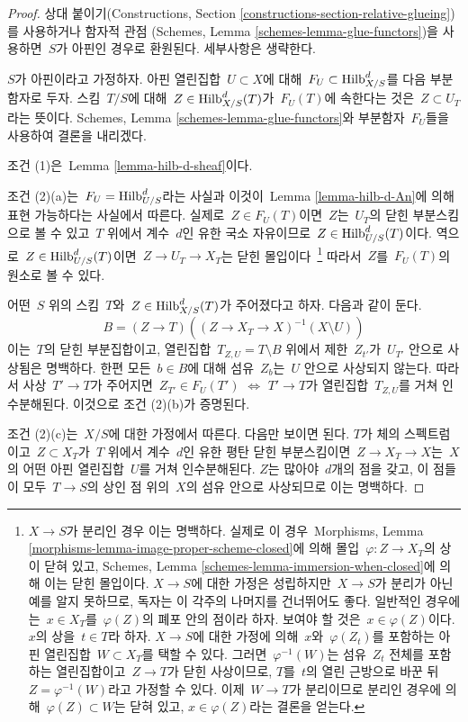 \begin{proof}
상대 붙이기(Constructions, Section
\ref{constructions-section-relative-glueing})를 사용하거나 함자적 관점
(Schemes, Lemma \ref{schemes-lemma-glue-functors})을 사용하면\ 
$S$가 아핀인 경우로 환원된다. 세부사항은 생략한다.

\medskip\noindent
$S$가 아핀이라고 가정하자. 아핀 열린집합\  $U \subset X$에 대해\ 
$F_U \subset \mathrm{Hilb}^d_{X/S}$를 다음 부분함자로 두자.
스킴\  $T/S$에 대해\  $Z \in \mathrm{Hilb}^d_{X/S}(T)$가\ 
$F_U(T)$에 속한다는 것은\  $Z \subset U_T$라는 뜻이다. Schemes, Lemma
\ref{schemes-lemma-glue-functors}와 부분함자\  $F_U$들을 사용하여 결론을
내리겠다.

\medskip\noindent
조건 (1)은\  Lemma \ref{lemma-hilb-d-sheaf}이다.

\medskip\noindent
조건 (2)(a)는\  $F_U = \mathrm{Hilb}^d_{U/S}$라는 사실과 이것이\  Lemma
\ref{lemma-hilb-d-An}에 의해 표현 가능하다는 사실에서 따른다.
실제로\  $Z \in F_U(T)$이면\  $Z$는\  $U_T$의 닫힌 부분스킴으로 볼 수 있고\ 
$T$ 위에서 계수\  $d$인 유한 국소 자유이므로\ 
$Z \in \mathrm{Hilb}^d_{U/S}(T)$이다. 역으로\ 
$Z \in \mathrm{Hilb}^d_{U/S}(T)$이면\  $Z \to U_T \to X_T$는 닫힌 몰입이다\ 
\footnote{$X \to S$가 분리인 경우 이는 명백하다. 실제로 이 경우\ 
Morphisms, Lemma \ref{morphisms-lemma-image-proper-scheme-closed}에 의해
몰입\  $\varphi : Z \to X_T$의 상이 닫혀 있고, Schemes, Lemma
\ref{schemes-lemma-immersion-when-closed}에 의해 이는 닫힌 몰입이다.
$X \to S$에 대한 가정은 성립하지만\  $X \to S$가 분리가 아닌 예를 알지
못하므로, 독자는 이 각주의 나머지를 건너뛰어도 좋다. 일반적인 경우에는\ 
$x \in X_T$를\  $\varphi(Z)$의 폐포 안의 점이라 하자. 보여야 할 것은\ 
$x \in \varphi(Z)$이다. $x$의 상을\ 
$t \in T$라 하자. $X \to S$에 대한 가정에 의해\  $x$와\ 
$\varphi(Z_t)$를 포함하는 아핀 열린집합\  $W \subset X_T$를 택할 수 있다.
그러면\  $\varphi^{-1}(W)$는 섬유\  $Z_t$ 전체를 포함하는 열린집합이고\ 
$Z \to T$가 닫힌 사상이므로, $T$를\  $t$의 열린 근방으로 바꾼 뒤\ 
$Z = \varphi^{-1}(W)$라고 가정할 수 있다. 이제\  $W \to T$가 분리이므로
분리인 경우에 의해\  $\varphi(Z) \subset W$는 닫혀 있고,
$x \in \varphi(Z)$라는 결론을 얻는다.}
따라서\  $Z$를\  $F_U(T)$의 원소로 볼 수 있다.

\medskip\noindent
어떤\  $S$ 위의 스킴\  $T$와\  $Z \in \mathrm{Hilb}^d_{X/S}(T)$가 주어졌다고
하자. 다음과 같이 둔다.
$$
B = (Z \to T)\left((Z \to X_T \to X)^{-1}(X \setminus U)\right)
$$
이는\  $T$의 닫힌 부분집합이고, 열린집합\  $T_{Z, U} = T \setminus B$ 위에서
제한\  $Z_{t'}$가\  $U_{T'}$ 안으로 사상됨은 명백하다. 한편 모든\ 
$b \in B$에 대해 섬유\  $Z_b$는\  $U$ 안으로 사상되지 않는다. 따라서
사상\  $T' \to T$가 주어지면\ 
$Z_{T'} \in F_U(T')$ $\Leftrightarrow$ $T' \to T$가 열린집합\ 
$T_{Z, U}$를 거쳐 인수분해된다. 이것으로 조건 (2)(b)가 증명된다.

\medskip\noindent
조건 (2)(c)는\  $X/S$에 대한 가정에서 따른다. 다음만 보이면 된다.
$T$가 체의 스펙트럼이고\  $Z \subset X_T$가\  $T$ 위에서 계수\  $d$인 유한
평탄 닫힌 부분스킴이면\  $Z \to X_T \to X$는\  $X$의 어떤 아핀 열린집합\ 
$U$를 거쳐 인수분해된다. $Z$는 많아야\  $d$개의 점을 갖고, 이 점들이 모두\ 
$T \to S$의 상인 점 위의\  $X$의 섬유 안으로 사상되므로 이는 명백하다.
\end{proof}

